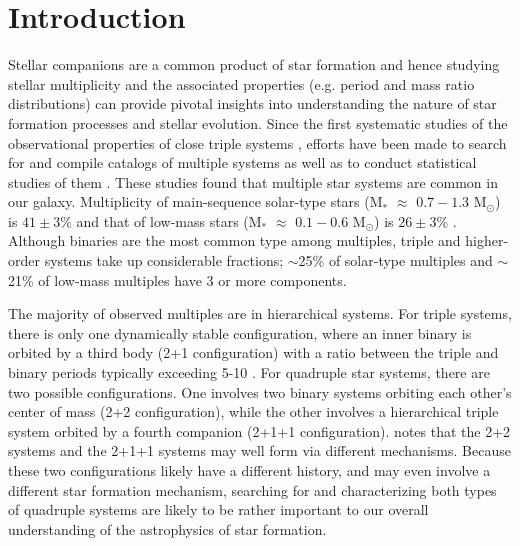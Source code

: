 \documentclass[fleqn,usenatbib]{mnras} %
\begin{document}
\section{Introduction}

\indent Stellar companions are a common product of star formation and hence studying stellar multiplicity and the associated properties (e.g. period and mass ratio distributions) can provide pivotal insights into understanding the nature of star formation processes and stellar evolution. Since the first systematic studies of the observational properties of close triple systems \citep[][]{Fekel1981}, efforts have been made to search for and compile catalogs of multiple systems \citep[e.g. see][ and references therein]{Tokovinin1997, Tokovinin2008, Tokovinin2014a, Eggleton2009, Raghavan2010, Rappaport2013, Borkovits2016} as well as to conduct statistical studies of them \citep[e.g.][]{Duchene2013, Winters2019}. These studies found that multiple star systems are common in our galaxy. Multiplicity of main-sequence solar-type stars (M$_*$ $\approx$ $0.7-1.3$ M$_{\odot}$) is $41 \pm 3\%$ \citep[][]{Raghavan2010} and that of low-mass stars (M$_*$ $\approx$ $0.1-0.6$ M$_{\odot}$) is $26 \pm 3\%$ \citep[][]{Winters2019}. Although binaries are the most common type among multiples, triple and higher-order systems take up considerable fractions; $\sim$25\% of solar-type multiples \citep[][]{Eggleton2008} and $\sim$21\% of low-mass multiples \citep[][]{Reid2000} have 3 or more components.

The majority of observed multiples are in hierarchical systems. For triple systems, there is only one dynamically stable configuration, where an inner binary is orbited by a third body (2+1 configuration) with a ratio between the triple and binary periods typically exceeding 5-10 \citep[see, e.~g.][]{Mardling2001}. For quadruple star systems, there are two possible configurations. One involves two binary systems orbiting each other's center of mass (2+2 configuration), while the other involves a hierarchical triple system orbited by a fourth companion (2+1+1 configuration). \citet[][]{Tokovinin2014b} notes that the 2+2 systems and the 2+1+1 systems may well form via different mechanisms. Because these two configurations likely have a different history, and may even involve a different star formation mechanism, searching for and characterizing both types of quadruple systems are likely to be rather important to our overall understanding of the astrophysics of star formation.
\end{document}
